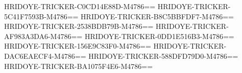 HRIDOYE-TRICKER-C0CD14E88D-M4786==
HRIDOYE-TRICKER-5C41F7593B-M4786==
HRIDOYE-TRICKER-B8C5BBFDF7-M4786==
HRIDOYE-TRICKER-2538BDB79B-M4786==
HRIDOYE-TRICKER-AF983A3DA6-M4786==
HRIDOYE-TRICKER-0DD1E516B3-M4786==
HRIDOYE-TRICKER-156E9C83F0-M4786==
HRIDOYE-TRICKER-DAC6EAECF4-M4786==
HRIDOYE-TRICKER-588DFD79D0-M4786==
HRIDOYE-TRICKER-BA1075F4E6-M4786==

